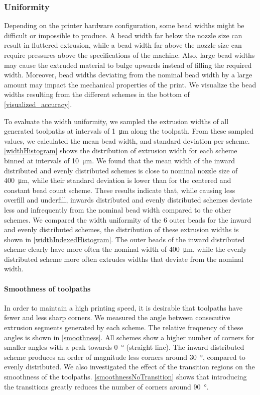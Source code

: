 








\subsubsection{Uniformity}
Depending on the printer hardware configuration, some bead widths might be difficult or impossible to produce.
A bead width far below the nozzle size can result in fluttered extrusion, while a bead width far above the nozzle size can require pressures above the specifications of the machine. 
Also, large bead widths may cause the extruded material to bulge upwards instead of filling the required width.
Moreover, bead widths deviating from the nominal bead width by a large amount may impact the mechanical properties of the print.
We visualize the bead widths resulting from the different schemes in the bottom of \cref{visualized_accuracy}.

To evaluate the width uniformity, we sampled the extrusion widths of all generated toolpaths 
at intervals of \SI{1}{\micro\meter} along the toolpath.
From these sampled values, we calculated the mean bead width, and standard deviation per scheme.
\cref{widthHistogram} shows the distribution of extrusion width for each scheme binned at intervals of \SI{10}{\micro\meter}.
We found that the mean width of the inward distributed and evenly distributed schemes is close to nominal nozzle size of \SI{400}{\micro\meter}, while their standard deviation is lower than for the centered and constant bead count scheme. 
These results indicate that, while causing less overfill and underfill, inwards distributed and evenly distributed schemes deviate less and infrequently from the nominal bead width compared to the other schemes.
We compared the width uniformity of the 6 outer beads for the inward and evenly distributed schemes, the distribution of these extrusion widths is shown in \cref{widthIndexedHistogram}. 
The outer beads of the inward distributed scheme clearly have more often the nominal width of \SI{400}{\micro\meter}, while the evenly distributed scheme more often extrudes widths that deviate from the nominal width.

\paragraph{Smoothness of toolpaths}
In order to maintain a high printing speed, it is desirable that toolpaths have fewer and less sharp corners. 
We measured the angle between consecutive extrusion segments generated by each scheme.
The relative frequency of these angles is shown in \cref{smoothness}.
All schemes show a higher number of corners for smaller angles with a peak towards \SI{0}{\degree} (straight line).
The inward distributed scheme produces an order of magnitude less corners around \SI{30}{\degree}, compared to evenly distributed. 
We also investigated the effect of the transition regions on the smoothness of the toolpaths. 
\cref{smoothnessNoTransition} shows that introducing the transitions greatly reduces the number of corners around \SI{90}{\degree}. 

